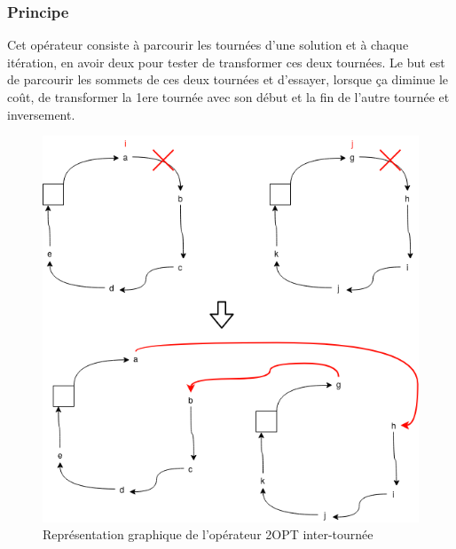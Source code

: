 \documentclass{article}
\begin{document}
\subsubsection{Principe}
Cet opérateur consiste à parcourir les tournées d'une solution et à chaque itération, en avoir
deux pour tester de transformer ces deux tournées. Le but est de parcourir les sommets de
ces deux tournées et d'essayer, lorsque ça diminue le coût, de transformer la 1ere tournée
avec son début et la fin de l'autre tournée et inversement.

\begin{figure}[!ht]
  \caption{Représentation graphique de l'opérateur 2OPT inter-tournée}
  \centering
  \includegraphics[scale=0.60]{images/inter-tournee.png}
\end{figure}

\newpage
\end{document}
